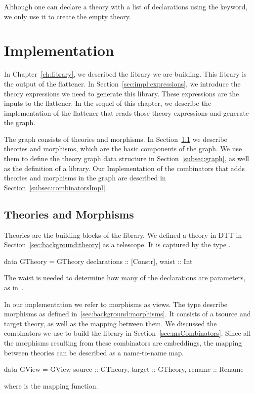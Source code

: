 Although one can declare a theory with a list of declarations using the  keyword, we only use it to create the empty theory. 


\section{Implementation}
\label{subsec:theoriesMorphisms}
In Chapter~\ref{ch:library}, we described the library we are building. This library is the output of the flattener. In Section~\ref{sec:impl:expressions}, we introduce the theory expressions we need to generate this library. These expressions are the inputs to the flattener. In the sequel of this chapter, we describe the implementation of the flattener that reads those theory expressions and generate the graph. 

The graph consists of theories and morphisms. In Section~\ref{sec:impl:Theories} we describe theories and morphisms, which are the basic components of the graph. We use them to define the theory graph data structure in Section~\ref{subsec:graph}, as well as the definition of a library. Our Implementation of the combinators that adds theories and morphisms in the graph are described in Section~\ref{subsec:combinatorsImpl}. 

\subsection{Theories and Morphisms}
\label{sec:impl:Theories}
Theories are the building blocks of the library. We defined a theory in DTT in Section~\ref{sec:background:theory} as a telescope.  It is captured by the type . 
\begin{hscode}
data GTheory = GTheory {
  declarations :: [Constr],
  waist        :: Int     }
\end{hscode}
The waist is needed to determine how many of the declarations are parameters, as in~\cite{alhassy2019}. 

In our implementation we refer to morphisms as views. The type  describe morphisms as defined in~\ref{sec:background:morphisms}. It consists of a tsource and target theory, as well as the mapping between them. We discussed the combinators we use to build the library in Section~\ref{sec:msCombinators}. Since all the morphisms resulting from these combinators are embeddings, the mapping between theories can be described as a name-to-name map. 
\begin{hscode}
data GView  = GView {
  source  :: GTheory,
  target  :: GTheory,
  rename  :: Rename }  
\end{hscode}
\noindent where  is the mapping function. 

